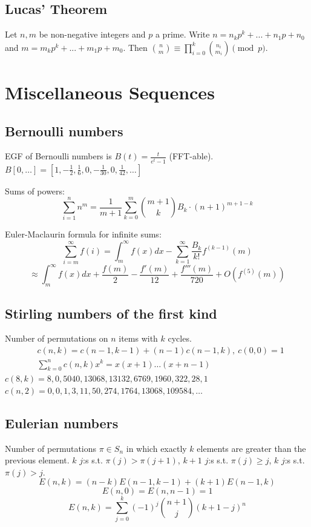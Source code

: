 	\subsection{Lucas' Theorem}
		Let $n,m$ be non-negative integers and $p$ a prime. Write $n=n_kp^k+...+n_1p+n_0$ and $m=m_kp^k+...+m_1p+m_0$. Then $\binom{n}{m} \equiv \prod_{i=0}^k\binom{n_i}{m_i} \pmod{p}$.

\vspace{1em}
\section{Miscellaneous Sequences}
	\subsection{Bernoulli numbers}
		EGF of Bernoulli numbers is $B(t)=\frac{t}{e^t-1}$ (FFT-able).
		$B[0,\ldots] = [1, -\frac{1}{2}, \frac{1}{6}, 0, -\frac{1}{30}, 0, \frac{1}{42}, \ldots]$

		Sums of powers:
		\small
		$$ \sum_{i=1}^n n^m = \frac{1}{m+1} \sum_{k=0}^m \binom{m+1}{k} B_k \cdot (n+1)^{m+1-k} $$
		\normalsize

		Euler-Maclaurin formula for infinite sums:
		\small
		$$ \sum_{i=m}^{\infty} f(i) = \int_m^\infty f(x) dx - \sum_{k=1}^\infty \frac{B_k}{k!}f^{(k-1)}(m) $$
		$$ \approx \int_{m}^\infty f(x)dx + \frac{f(m)}{2} - \frac{f'(m)}{12} + \frac{f'''(m)}{720} + O(f^{(5)}(m)) $$
		\normalsize

	\subsection{Stirling numbers of the first kind}
		Number of permutations on $n$ items with $k$ cycles.
		\begin{align*}
			&c(n,k) = c(n-1,k-1) + (n-1) c(n-1,k),\ c(0,0) = 1 \\
			&\textstyle \sum_{k=0}^n c(n,k)x^k = x(x+1) \dots (x+n-1)
		\end{align*}
		$c(8,k) = 8, 0, 5040, 13068, 13132, 6769, 1960, 322, 28, 1$ \\
		$c(n,2) = 0, 0, 1, 3, 11, 50, 274, 1764, 13068, 109584, \dots$

	\subsection{Eulerian numbers}
		Number of permutations $\pi \in S_n$ in which exactly $k$ elements are greater than the previous element. $k$ $j$:s s.t. $\pi(j)>\pi(j+1)$, $k+1$ $j$:s s.t. $\pi(j)\geq j$, $k$ $j$:s s.t. $\pi(j)>j$.
		$$E(n,k) = (n-k)E(n-1,k-1) + (k+1)E(n-1,k)$$
		$$E(n,0) = E(n,n-1) = 1$$
		$$E(n,k) = \sum_{j=0}^k(-1)^j\binom{n+1}{j}(k+1-j)^n$$

